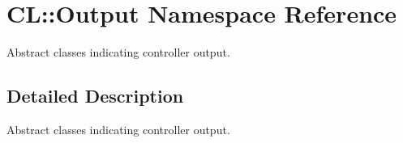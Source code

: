 \hypertarget{namespaceCL_1_1Output}{\section{\-C\-L\-:\-:\-Output \-Namespace \-Reference}
\label{namespaceCL_1_1Output}
}


\-Abstract classes indicating controller output.  




\subsection{\-Detailed \-Description}
\-Abstract classes indicating controller output. 
